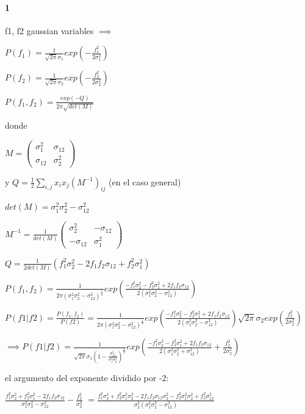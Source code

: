 \documentclass[12pt]{book}
\begin{document}
\paragraph{1}

f1, f2 gaussian variables $\implies$

$P(f_1) = \frac{1}{\sqrt{2\pi} \sigma_1} exp(-\frac{f_1^2}{2\sigma_1^2})$

$P(f_2) = \frac{1}{\sqrt{2\pi} \sigma_2} exp(-\frac{f_2^2}{2\sigma_2^2})$

$P(f_1,f_2) = \frac{exp(-Q)}{2\pi \sqrt{det(M)}}$

donde

$M=
\begin{pmatrix}
\sigma_1^2 & \sigma_{12}\\
\sigma_{12} & \sigma_2^{2}
\end{pmatrix}
$

y $Q = \frac{1}{2}\sum_{i,j}{x_i x_j (M^{-1})_{ij}} $   (en el caso general)

$det(M) =  \sigma_1^2  \sigma_2^2 - \sigma_{12}^2$

$M^{-1}=\frac{1}{det(M)}
\begin{pmatrix}
\sigma_2^2 & -\sigma_{12}\\
-\sigma_{12} & \sigma_1^{2}
\end{pmatrix}
$

$Q = \frac{1}{2 det(M)}(f_1^2 \sigma_2^2 - 2 f_1 f_2 \sigma_{12} + f_2^2 \sigma_1^2) $
 
$P(f_1,f_2) = \frac{1}{2\pi (\sigma_1^2  \sigma_2^2 - \sigma_{12}^2)^{\frac{1}{2}}} exp(\frac{-f_1^2 \sigma_2^2  - f_2^2 \sigma_1^2
 + 2 f_1 f_2 \sigma_{12}}{2(\sigma_1^2 \sigma_2^2 - \sigma_{12}^2)})$

$P(f1|f2) = \frac{P(f_1,f_2)}{P(f2)} = \frac{1}{2\pi (\sigma_1^2  \sigma_2^2 - \sigma_{12}^2)^{\frac{1}{2}}} 
exp(\frac{-f_1^2 \sigma_2^2  - f_2^2 \sigma_1^2
 + 2 f_1 f_2 \sigma_{12}}{2(\sigma_1^2 \sigma_2^2 - \sigma_{12}^2)}) \sqrt{2\pi} \sigma_2 exp(\frac{f_2^2}{2 \sigma_2^2})$

$\implies P(f1|f2) = \frac{1}{\sqrt{2\pi}\sigma_1 (1 - \frac{\sigma_{12}^2}{\sigma_1^2 \sigma_2^2} )^{\frac{1}{2}}} 
exp(\frac{-f_1^2 \sigma_2^2  - f_2^2 \sigma_1^2
 + 2 f_1 f_2 \sigma_{12}}{2(\sigma_1^2 \sigma_2^2 + \sigma_{12}^2)} + \frac{f_2^2}{2\sigma_2^2})$

el argumento del exponente dividido por -2:

$\frac{f_1^2 \sigma_2^2  +f_2^2 \sigma_1^2 - 2 f_1 f_2 \sigma_{12}}{\sigma_1^2 \sigma_2^2 - \sigma_{12}^2} - \frac{f_2^2}{\sigma_2^2} $
$= \frac{f_1^2 \sigma_2^4  +f_2^2 \sigma_1^2\sigma_2^2 - 2f_1 f_2 \sigma_{12} \sigma_2^2 - f_2^2 \sigma_1^2 \sigma_2^2 + f_2^2 \sigma_{12}^2 }{\sigma_2^2(\sigma_1^2 \sigma_2^2 - \sigma_{12}^2)}$
\end{document}
